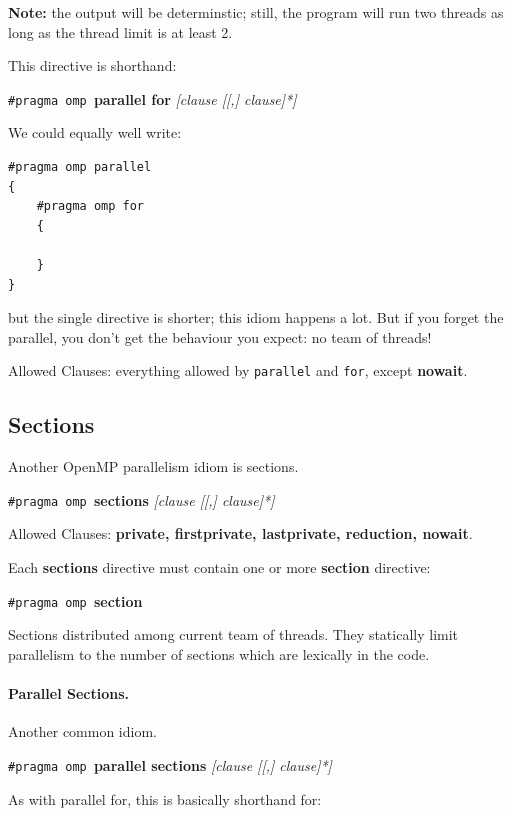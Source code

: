 \documentclass[a4paper]{report}
\begin{document}
  {\bf Note:} the output will be determinstic; still, the program will run two threads as
  long as the thread limit is at least 2.

This directive is shorthand:

  \begin{center}
    {\tt \#pragma omp }{\bf parallel for} {\it [clause [[,] clause]*]}
  \end{center}

We could equally well write:
{\small
  \begin{lstlisting}
#pragma omp parallel
{
    #pragma omp for
    {

    }
}
  \end{lstlisting}
}
but the single directive is shorter; this idiom happens a lot. But if you forget the parallel, you don't get the behaviour you expect: no team of threads!

Allowed Clauses: everything allowed by {\tt parallel} and {\tt for}, except
  {\bf nowait}.

\subsection*{Sections}
Another OpenMP parallelism idiom is sections.
  \begin{center}
    {\tt \#pragma omp }{\bf sections} {\it [clause [[,] clause]*]}
  \end{center}

  Allowed Clauses: {\bf private, firstprivate, lastprivate, reduction, nowait}.

Each {\bf sections} directive must contain one or more {\bf section} directive:
  \begin{center}
    {\tt \#pragma omp }{\bf section}
  \end{center}
  
Sections distributed among current team of threads.
They statically limit parallelism to the number of
      sections which are lexically in the code.

\paragraph{Parallel Sections.} Another common idiom.
  \begin{center}
    {\tt \#pragma omp }{\bf parallel sections} {\it [clause [[,] clause]*]}
  \end{center}

  As with parallel for, this is basically shorthand for:
  
\end{document}
